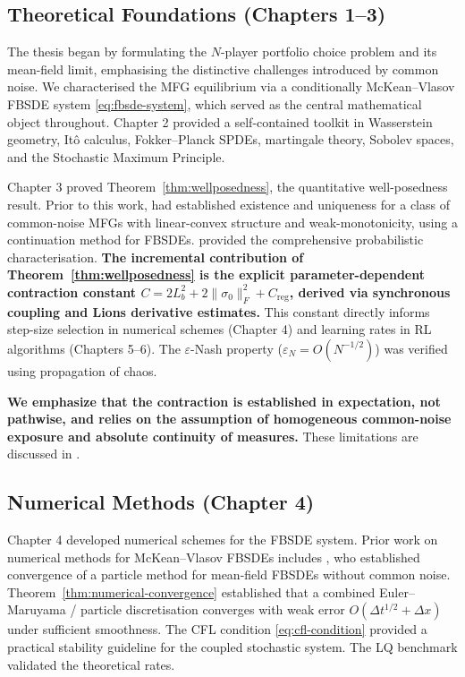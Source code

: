 \subsection{Theoretical Foundations (Chapters 1--3)}

The thesis began by formulating the $N$-player portfolio choice problem and its
mean-field limit, emphasising the distinctive challenges introduced by common
noise. We characterised the MFG equilibrium via a conditionally McKean--Vlasov
FBSDE system \eqref{eq:fbsde-system}, which served as the central mathematical
object throughout. Chapter 2 provided a self-contained toolkit in Wasserstein
geometry, It\^o calculus, Fokker--Planck SPDEs, martingale theory, Sobolev spaces,
and the Stochastic Maximum Principle.

Chapter 3 proved Theorem~\ref{thm:wellposedness}, the quantitative well-posedness
result. Prior to this work, \citep{ahujarenyang2019} had established existence
and uniqueness for a class of common-noise MFGs with linear-convex structure and
weak-monotonicity, using a continuation method for FBSDEs. \citep{carmonadelarue2018} provided the comprehensive probabilistic characterisation.
\textbf{The incremental contribution of Theorem~\ref{thm:wellposedness} is the
explicit parameter-dependent contraction constant $C = 2L_b^2 + 2\|\sigma_0\|_F^2 +
C_{\mathrm{reg}}$, derived via synchronous coupling and Lions derivative
estimates.} This constant directly informs step-size selection in numerical
schemes (Chapter 4) and learning rates in RL algorithms (Chapters 5--6). The
$\varepsilon$-Nash property ($\varepsilon_N = O(N^{-1/2})$) was verified using
propagation of chaos.

\textbf{We emphasize that the contraction is established in expectation, not
pathwise, and relies on the assumption of homogeneous common-noise exposure and
absolute continuity of measures.} These limitations are discussed in
.

\subsection{Numerical Methods (Chapter 4)}

Chapter 4 developed numerical schemes for the FBSDE system. Prior work on
numerical methods for McKean--Vlasov FBSDEs includes \citep{chassagneuxcrisandelarue2019}, who established convergence of a particle method for mean-field
FBSDEs without common noise. Theorem~\ref{thm:numerical-convergence} established
that a combined Euler--Maruyama / particle discretisation converges with weak
error $O(\Delta t^{1/2} + \Delta x)$ under sufficient smoothness. The CFL
condition \eqref{eq:cfl-condition} provided a practical stability guideline for the
coupled stochastic system. The LQ benchmark validated the theoretical rates.

